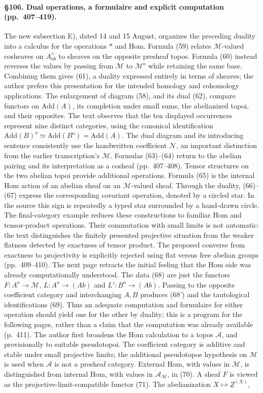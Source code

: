 \paragraph{\S106. Dual operations, a formulaire and explicit computation (pp.\ 407--419).}
The new subsection E), dated 14 and 15 August, organizes the preceding duality into a calculus for the operations $*$ and Hom. Formula (59) relates $\mathcal M$-valued cosheaves on $A^\wedge_{ab}$ to sheaves on the opposite presheaf topos. Formula (60) instead reverses the values by passing from $\mathcal M$ to $\mathcal M^o$ while retaining the same base. Combining them gives (61), a duality expressed entirely in terms of sheaves; the author prefers this presentation for the intended homology and cohomology applications. The enlargement of diagram (58), and its dual (62), compare functors on $\mathrm{Add}(A)$, its completion under small sums, the abelianized topoi, and their opposites. The text observes that the ten displayed occurrences represent nine distinct categories, using the canonical identification $\mathrm{Add}(B)^o\simeq\mathrm{Add}(B^o)=\mathrm{Add}(A)$. The dual diagram and its introducing sentence consistently use the handwritten coefficient $\mathcal N$, an important distinction from the earlier transcription's $\mathcal M$. Formulas (63)--(64) return to the abelian pairing and its interpretation as a cosheaf (pp.\ 407--408). Tensor structures on the two abelian topoi provide additional operations. Formula (65) is the internal Hom action of an abelian sheaf on an $\mathcal M$-valued sheaf. Through the duality, (66)--(67) express the corresponding covariant operation, denoted by a circled star. In the source this sign is repeatedly a typed star surrounded by a hand-drawn circle. The final-category example reduces these constructions to familiar Hom and tensor-product operations. Their commutation with small limits is not automatic: the text distinguishes the finitely presented projective situation from the weaker flatness detected by exactness of tensor product. The proposed converse from exactness to projectivity is explicitly rejected using flat versus free abelian groups (pp.\ 409--410). The next page retracts the initial feeling that the Hom side was already computationally understood. The data (68) are just the functors $F:A^o\to\mathcal M$, $L:A^o\to(Ab)$ and $L':B^o\to(Ab)$. Passing to the opposite coefficient category and interchanging $A,B$ produces (68') and the tautological identifications (69). Thus an adequate computation and formulaire for either operation should yield one for the other by duality; this is a program for the following pages, rather than a claim that the computation was already available (p.\ 411). The author first broadens the Hom calculation to a topos $\mathcal A$, and provisionally to suitable pseudotopoi. The coefficient category is additive and stable under small projective limits; the additional pseudotopos hypothesis on $\mathcal M$ is used when $\mathcal A$ is not a presheaf category. External Hom, with values in $\mathcal M$, is distinguished from internal Hom, with values in $\mathcal A_{\mathcal M}$, in (70). A sheaf $F$ is viewed as the projective-limit-compatible functor (71). The abelianization $X\mapsto\underline Z^{(X)}$, 